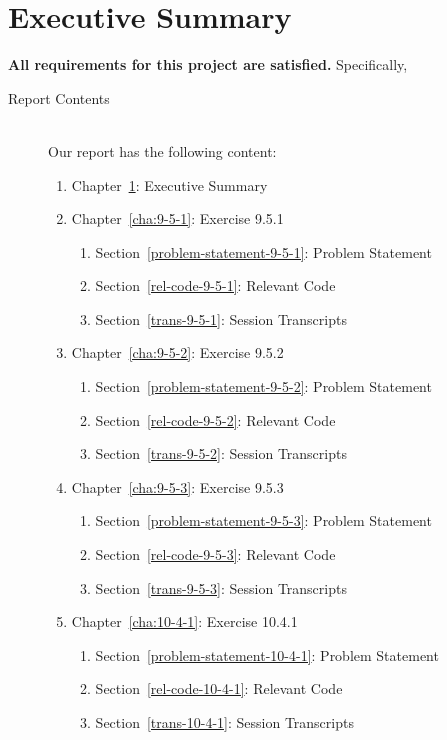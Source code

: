 \documentclass{report}
\begin{document}
\chapter{Executive Summary}
\label{cha:executive-summary}
\textbf{All requirements for this project are satisfied.}
Specifically,
\begin{description}
\item[Report Contents] \ \\
  Our report has the following content:
  \begin{enumerate}[{}]
  \item Chapter~\ref{cha:executive-summary}: Executive Summary
  \item Chapter~\ref{cha:9-5-1}: Exercise 9.5.1
    \begin{enumerate}[{}]
    \item Section~\ref{problem-statement-9-5-1}: Problem Statement
    \item Section~\ref{rel-code-9-5-1}: Relevant Code 
    \item Section~\ref{trans-9-5-1}: Session Transcripts
    \end{enumerate}
  \item Chapter~\ref{cha:9-5-2}: Exercise 9.5.2
    \begin{enumerate}[{}]
    \item Section~\ref{problem-statement-9-5-2}: Problem Statement
    \item Section~\ref{rel-code-9-5-2}: Relevant Code
    \item Section~\ref{trans-9-5-2}: Session Transcripts
    \end{enumerate}
  \item Chapter~\ref{cha:9-5-3}: Exercise 9.5.3
    \begin{enumerate}[{}]
    \item Section~\ref{problem-statement-9-5-3}: Problem Statement
    \item Section~\ref{rel-code-9-5-3}: Relevant Code
    \item Section~\ref{trans-9-5-3}: Session Transcripts
    \end{enumerate}
\item Chapter~\ref{cha:10-4-1}: Exercise 10.4.1
    \begin{enumerate}[{}]
    \item Section~\ref{problem-statement-10-4-1}: Problem Statement
    \item Section~\ref{rel-code-10-4-1}: Relevant Code 
    \item Section~\ref{trans-10-4-1}: Session Transcripts

\end{enumerate}
\end{enumerate}
\end{description}
\end{document}
